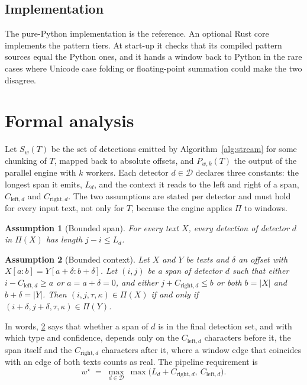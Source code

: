\documentclass[pdflatex,sn-mathphys-num]{sn-jnl}
\theoremstyle{thmstyleone}
\theoremstyle{thmstylethree}
\newtheorem{assumption}{Assumption}
\begin{document}
\subsection{Implementation}
The pure-Python implementation is the reference. An optional Rust core implements the pattern tiers. At start-up it checks that its compiled pattern sources equal the Python ones, and it hands a window back to Python in the rare cases where Unicode case folding or floating-point summation could make the two disagree.


\section{Formal analysis}\label{sec:formal}

Let $S_w(T)$ be the set of detections emitted by Algorithm~\ref{alg:stream} for some chunking of $T$, mapped back to absolute offsets, and $P_{w,k}(T)$ the output of the parallel engine with $k$ workers. Each detector $d \in \mathcal{D}$ declares three constants: the longest span it emits, $L_d$, and the context it reads to the left and right of a span, $C_{\mathrm{left},d}$ and $C_{\mathrm{right},d}$. The two assumptions are stated per detector and must hold for every input text, not only for $T$, because the engine applies $\Pi$ to windows.

\begin{assumption}[Bounded span]\label{as:span}
For every text $X$, every detection of detector $d$ in $\Pi(X)$ has length $j - i \le L_d$.
\end{assumption}

\begin{assumption}[Bounded context]\label{as:ctx}
Let $X$ and $Y$ be texts and $\delta$ an offset with $X[a{:}b] = Y[a{+}\delta : b{+}\delta]$. Let $(i, j)$ be a span of detector $d$ such that either $i - C_{\mathrm{left},d} \ge a$ or $a = a + \delta = 0$, and either $j + C_{\mathrm{right},d} \le b$ or both $b = |X|$ and $b + \delta = |Y|$. Then $(i, j, \tau, \kappa) \in \Pi(X)$ if and only if $(i + \delta, j + \delta, \tau, \kappa) \in \Pi(Y)$.
\end{assumption}

In words, \ref{as:ctx} says that whether a span of $d$ is in the final detection set, and with which type and confidence, depends only on the $C_{\mathrm{left},d}$ characters before it, the span itself and the $C_{\mathrm{right},d}$ characters after it, where a window edge that coincides with an edge of both texts counts as real. The pipeline requirement is
\begin{equation}\label{eq:wstar}
w^{\star} \;=\; \max_{d \in \mathcal{D}}\ \max\bigl(L_d + C_{\mathrm{right},d},\ C_{\mathrm{left},d}\bigr).
\end{equation}
\end{document}
